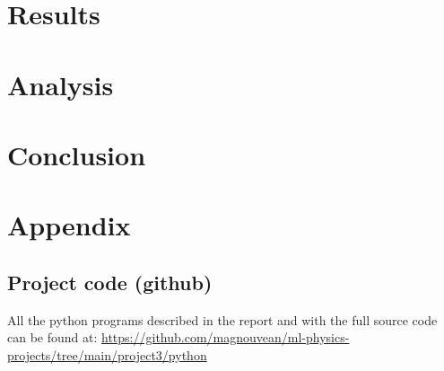 \documentclass{article}
\begin{document}
\section{Results}

\section{Analysis}

\section{Conclusion}

\section{Appendix}

\subsection{Project code (github)}
All the python programs described in the report and with the full source code can be
found at:
\url{https://github.com/magnouvean/ml-physics-projects/tree/main/project3/python}


\end{document}
